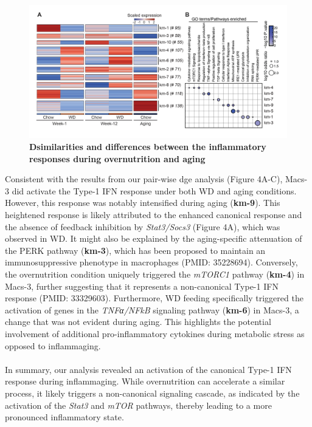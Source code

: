 \begin{figure}[H]
\centering
\includegraphics[width=\linewidth]{Chapter4/Fig/F2-11-02.png}
\caption[res-macs3-2]{\textbf{Dsimilarities and differences between the inflammatory responses during overnutrition and aging}
}
\label{fig2-12}
\end{figure}


Consistent with the results from our pair-wise \gls{dge} analysis (Figure 4A-C), Macs-3 did activate the Type-1 IFN response under both WD and aging conditions. However, this response was notably intensified during aging (\textbf{km-9}). This heightened response is likely attributed to the enhanced canonical response and the absence of feedback inhibition by \textit{Stat3/Socs3} (Figure 4A), which was observed in WD. It might also be explained by the aging-specific attenuation of the PERK pathway (\textbf{km-3}), which has been proposed to maintain an immunosuppressive phenotype in macrophages (PMID: 35228694). Conversely, the overnutrition condition uniquely triggered the \textit{mTORC1} pathway (\textbf{km-4}) in Macs-3, further suggesting that it represents a non-canonical Type-1 IFN response (PMID: 33329603). Furthermore, WD feeding specifically triggered the activation of genes in the \textit{TNFα/NFkB} signaling pathway (\textbf{km-6}) in Macs-3, a change that was not evident during aging. This highlights the potential involvement of additional pro-inflammatory cytokines during metabolic stress as opposed to inflammaging.\\\\
In summary, our analysis revealed an activation of the canonical Type-1 IFN response during inflammaging. While overnutrition can accelerate a similar process, it likely triggers a non-canonical signaling cascade, as indicated by the activation of the \textit{Stat3} and \textit{mTOR} pathways, thereby leading to a more pronounced inflammatory state.
\clearpage

